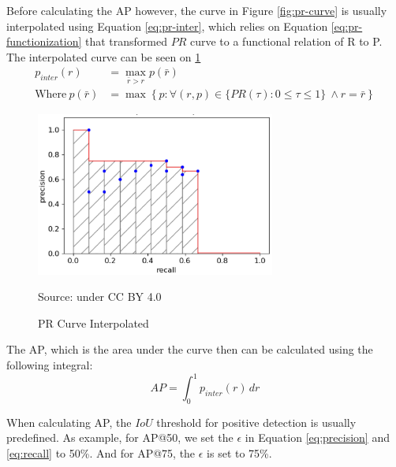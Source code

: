   Before calculating the AP however, the curve in Figure \ref{fig:pr-curve} is usually interpolated using Equation \ref{eq:pr-inter},
  which relies on Equation \ref{eq:pr-functionization} that transformed $PR$ curve to a functional relation of R to P.
  The interpolated curve can be seen on \ref{fig:pr-interp}
  \begin{align}
    \label{eq:pr-inter}
    p_{inter}(r) &= \max_{\bar{r}>r} p(\bar{r})\\
    \label{eq:pr-functionization}
    \text{Where}~p(\bar{r}) &= \max \left\{p : \forall (r,p) \in \{PR(\tau) : 0\leq\tau\leq 1\}\ \land r=\bar{r}\right\}%
  \end{align}

  \begin{figure}[p]
        \centering
        \includegraphics[width=0.7\textwidth]{figures/pr-interp.png}
        \caption*{Source: \textcite{map-hui} under CC BY 4.0}
        \vspace{-2ex}
        \caption{PR Curve Interpolated}
        \label{fig:pr-interp}
  \end{figure}
  The AP, which is the area under the curve then can be calculated using the following integral:
  \begin{equation}
    AP = \int_{0}^{1} p_{inter}(r) \, dr
  \end{equation}

  When calculating AP, the $IoU$ threshold for positive detection is usually predefined. As example,
  for AP@50, we set the $\epsilon$ in Equation \ref{eq:precision} and \ref{eq:recall} to 50\%. And for 
  AP@75, the $\epsilon$ is set to 75\%.


